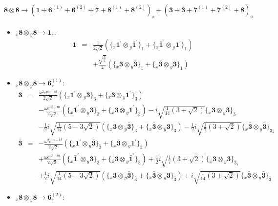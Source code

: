 \documentclass[english]{article}
\newcommand{\rep}[1]{\mathbf{#1}}
\newcommand{\repx}[2]{{}_{#2}\mathbf{#1}}
\newcommand{\subcg}[3]{\big\{ \repx{#1}{x}\otimes\repx{#2}{y}\big\}^{}_{#3}}
\begin{document}
\paragraph*{\Large $\rep{8}\otimes\rep{8}\to\left(\rep{1}+\rep{6}^{(1)}+\rep{6}^{(2)}+\rep{7}+\rep{8}^{(1)}+\rep{8}^{(2)}\right)_s+\left(\rep{3}+\rep{\bar{3}}+\rep{7}^{(1)}+\rep{7}^{(2)}+\rep{8}\right)_a$}
\begin{itemize}
\item $\repx{8}{x}\otimes\repx{8}{y}\to\rep{1}_{s}$:
\begin{eqnarray*}
\rep{1} &=& \frac{1}{2 \sqrt{2}}\left(\subcg{1^{\prime}}{\bar{1}^{\prime}}{1}+\subcg{\bar{1}^{\prime}}{1^{\prime}}{1}\right) \\ 
 & & +\frac{\sqrt{\frac{3}{2}}}{2}\left(\subcg{3}{\bar{3}}{1}+\subcg{\bar{3}}{3}{1}\right)
\end{eqnarray*}
\item $\repx{8}{x}\otimes\repx{8}{y}\to\rep{6}_{s}^{(1)}$:
\begin{eqnarray*}
\rep{3} &=& \frac{\omega ^2 e^{i \alpha -i \beta }}{2 \sqrt{2}}\left(\subcg{1^{\prime}}{3}{3}+\subcg{3}{1^{\prime}}{3}\right) \\ 
 & & -\frac{\omega  e^{i \beta -i \alpha }}{2 \sqrt{2}}\left(\subcg{\bar{1}^{\prime}}{3}{3}+\subcg{3}{\bar{1}^{\prime}}{3}\right)-i \sqrt{\frac{1}{14} \left(3+\sqrt{2}\right)}\subcg{3}{3}{3} \\ 
 & & -\frac{1}{2} i \sqrt{\frac{1}{14} \left(5-3 \sqrt{2}\right)}\left(\subcg{3}{\bar{3}}{3}+\subcg{\bar{3}}{3}{3}\right)-\frac{1}{2} i \sqrt{\frac{1}{7} \left(3+\sqrt{2}\right)}\subcg{\bar{3}}{\bar{3}}{3_{s}}
\\
\rep{\bar{3}} &=& -\frac{\omega ^2 e^{i \alpha -i \beta }}{2 \sqrt{2}}\left(\subcg{1^{\prime}}{\bar{3}}{\bar{3}}+\subcg{\bar{3}}{1^{\prime}}{\bar{3}}\right) \\ 
 & & +\frac{\omega  e^{i \beta -i \alpha }}{2 \sqrt{2}}\left(\subcg{\bar{1}^{\prime}}{\bar{3}}{\bar{3}}+\subcg{\bar{3}}{\bar{1}^{\prime}}{\bar{3}}\right)+\frac{1}{2} i \sqrt{\frac{1}{7} \left(3+\sqrt{2}\right)}\subcg{3}{3}{\bar{3}_{s}} \\ 
 & & +\frac{1}{2} i \sqrt{\frac{1}{14} \left(5-3 \sqrt{2}\right)}\left(\subcg{3}{\bar{3}}{\bar{3}}+\subcg{\bar{3}}{3}{\bar{3}}\right)+i \sqrt{\frac{1}{14} \left(3+\sqrt{2}\right)}\subcg{\bar{3}}{\bar{3}}{\bar{3}}
\end{eqnarray*}
\item $\repx{8}{x}\otimes\repx{8}{y}\to\rep{6}_{s}^{(2)}$:
\begin{eqnarray*}

\end{eqnarray*}
\end{itemize}
\end{document}
